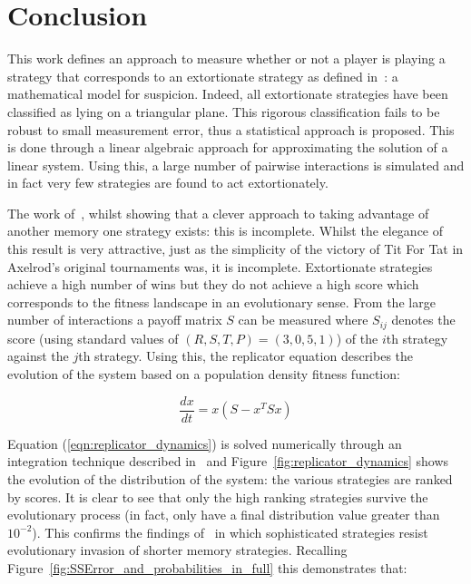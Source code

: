 \documentclass[a4paper]{article}
\begin{document}
\section{Conclusion}\label{sec:conclusion}

This work defines an approach to measure whether or not a player is playing a
strategy that corresponds to an extortionate strategy as defined
in~\cite{Press2012}: a mathematical model for suspicion. Indeed, all
extortionate strategies have been
 classified as lying on a triangular plane.
This rigorous classification fails to be robust to small measurement error, thus
a statistical approach is proposed.
This is done through a linear algebraic approach for approximating the solution
of a linear system. Using this, a large number of pairwise interactions is
simulated and in fact very few strategies are found to act extortionately.

The work of~\cite{Press2012}, whilst showing that a clever approach to taking
advantage of another memory one strategy exists: this is incomplete. Whilst the
elegance of this result is very attractive, just as the simplicity of the
victory of Tit For Tat in Axelrod's original tournaments was, it is incomplete.
Extortionate strategies achieve a high number of wins but they do not
achieve a high score which corresponds to the fitness landscape in an
evolutionary sense. From the large number of interactions a payoff matrix \(S\)
can be measured where \(S_{ij}\) denotes the score (using standard values of
\((R, S, T, P) = (3, 0, 5, 1)\)) of the \(i\)th strategy
against the \(j\)th strategy. Using this, the replicator equation
describes the evolution of the system based on a population density fitness
function:

\begin{equation}\label{eqn:replicator_dynamics}
    \frac{dx}{dt} = x(S-x^TS x)
\end{equation}

Equation (\ref{eqn:replicator_dynamics}) is solved numerically through an
integration technique described in~\cite{Petzold1983} and
Figure~\ref{fig:replicator_dynamics} shows the evolution of the distribution of
the system: the various strategies are ranked by scores. It is clear to see that
only the high ranking strategies survive the evolutionary process (in fact,
only 
have a final distribution value greater than \(10 ^ {-2}\)). This confirms the
findings of~\cite{Moran1707} in which sophisticated strategies resist
evolutionary invasion of shorter memory strategies. Recalling
Figure~\ref{fig:SSError_and_probabilities_in_full} this demonstrates that:
\end{document}
